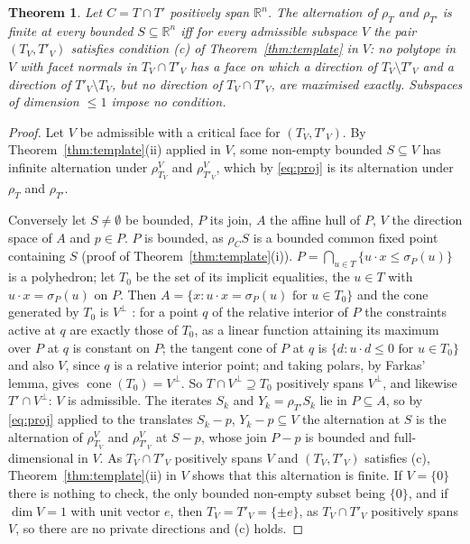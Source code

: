 \documentclass[11pt]{amsart}
\newtheorem{thm}{Theorem}[section]
\theoremstyle{definition}
\begin{document}
\begin{thm}\label{thm:lowdim}
Let $C=T\cap T'$ positively span $\mathbb R^n$. The alternation of
$\rho_T$ and $\rho_{T'}$ is finite at every bounded $S\subseteq\mathbb
R^n$ iff for every admissible subspace $V$ the pair $(T_V,T'_V)$
satisfies condition (c) of Theorem~\ref{thm:template} in $V$: no
polytope in $V$ with facet normals in $T_V\cap T'_V$ has a face on
which a direction of $T_V\setminus T'_V$ and a direction of $T'_V
\setminus T_V$, but no direction of $T_V\cap T'_V$, are maximised
exactly. Subspaces of dimension $\le1$ impose no condition.
\end{thm}
\begin{proof}
Let $V$ be admissible with a critical face for $(T_V,T'_V)$. By
Theorem~\ref{thm:template}(ii) applied in $V$, some non-empty bounded
$S\subseteq V$ has infinite alternation under $\rho^V_{T_V}$ and
$\rho^V_{T'_V}$, which by \eqref{eq:proj} is its alternation under
$\rho_T$ and $\rho_{T'}$.

Conversely let $S\ne\emptyset$ be bounded, $P$ its join, $A$ the affine
hull of $P$, $V$ the direction space of $A$ and $p\in P$. $P$ is
bounded, as $\rho_CS$ is a bounded common fixed point containing $S$
(proof of Theorem~\ref{thm:template}(i)). $P=\bigcap_{u\in T}\{u\cdot x
\le\sigma_P(u)\}$ is a polyhedron; let $T_0$ be the set of its implicit
equalities, the $u\in T$ with $u\cdot x=\sigma_P(u)$ on $P$. Then $A=
\{x:u\cdot x=\sigma_P(u)\text{ for }u\in T_0\}$ and the cone generated
by $T_0$ is $V^\perp$ \cite[Sect.~8.2]{Schrijver}: for a point $q$ of
the relative interior of $P$ the constraints active at $q$ are exactly
those of $T_0$, as a linear function attaining its maximum over $P$ at
$q$ is constant on $P$; the tangent cone of $P$ at $q$ is $\{d:u\cdot d
\le0\text{ for }u\in T_0\}$ and also $V$, since $q$ is a relative
interior point; and taking polars, by Farkas' lemma, gives $\operatorname
{cone}(T_0)=V^\perp$. So $T\cap V^\perp\supseteq T_0$ positively spans
$V^\perp$, and likewise $T'\cap V^\perp$: $V$ is admissible. The iterates $S_k$
and $Y_k=\rho_{T'}S_k$ lie in $P\subseteq A$, so by \eqref{eq:proj}
applied to the translates $S_k-p$, $Y_k-p\subseteq V$ the alternation
at $S$ is the alternation of $\rho^V_{T_V}$ and $\rho^V_{T'_V}$ at
$S-p$, whose join $P-p$ is bounded and full-dimensional in $V$. As
$T_V\cap T'_V$ positively spans $V$ and $(T_V,T'_V)$ satisfies (c),
Theorem~\ref{thm:template}(ii) in $V$ shows that this alternation is
finite. If $V=\{0\}$ there is nothing to check, the only bounded
non-empty subset being $\{0\}$, and if $\dim V=1$ with unit vector $e$,
then $T_V=T'_V=\{\pm e\}$, as $T_V\cap T'_V$ positively spans $V$, so
there are no private directions and (c) holds.
\end{proof}
\end{document}

